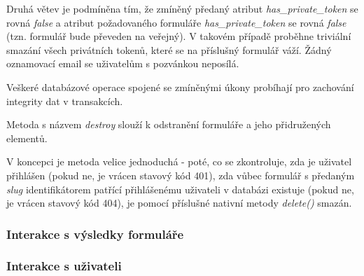 			Druhá větev je podmíněna tím, že zmíněný předaný atribut \textit{has\_private\_token} se rovná \textit{false} a atribut požadovaného formuláře \textit{has\_private\_token} se rovná \textit{false} (tzn. formulář bude převeden na veřejný). V takovém případě proběhne triviální smazání všech privátních tokenů, které se na příslušný formulář váží. Žádný oznamovací email se uživatelům s pozvánkou neposílá.
			
			Veškeré databázové operace spojené se zmíněnými úkony probíhají pro zachování integrity dat v transakcích.
			
			Metoda s názvem \textit{destroy} slouží k odstranění formuláře a jeho přidružených elementů.
			
			V koncepci je metoda velice jednoduchá - poté, co se zkontroluje, zda je uživatel přihlášen (pokud ne, je vrácen stavový kód 401), zda vůbec formulář s předaným \textit{slug} identifikátorem patřící přihlášenému uživateli v databázi existuje (pokud ne, je vrácen stavový kód 404), je pomocí příslušné nativní metody \textit{delete()} smazán.
			
		\subsubsection{Interakce s výsledky formuláře}
		
		\subsubsection{Interakce s uživateli}

